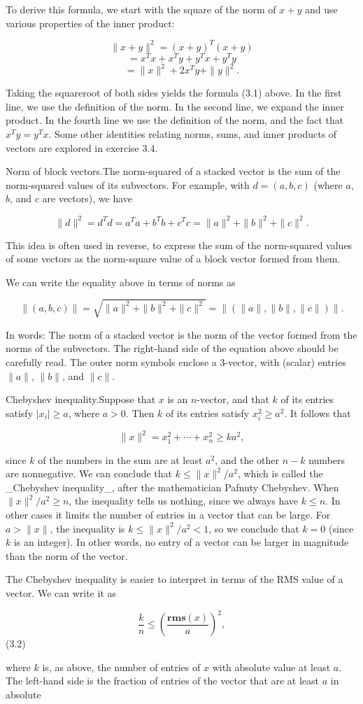 To derive this formula, we start with the square of the norm of \(x+y\) and use various properties of the inner product:

\[\|x+y\|^{2} = (x+y)^{T}(x+y)\] \[= x^{T}x+x^{T}y+y^{T}x+y^{T}y\] \[= \|x\|^{2}+2x^{T}y+\|y\|^{2}.\]

Taking the squareroot of both sides yields the formula (3.1) above. In the first line, we use the definition of the norm. In the second line, we expand the inner product. In the fourth line we use the definition of the norm, and the fact that \(x^{T}y=y^{T}x\). Some other identities relating norms, sums, and inner products of vectors are explored in exercise 3.4.

Norm of block vectors.The norm-squared of a stacked vector is the sum of the norm-squared values of its subvectors. For example, with \(d=(a,b,c)\) (where \(a\), \(b\), and \(c\) are vectors), we have

\[\|d\|^{2}=d^{T}d=a^{T}a+b^{T}b+c^{T}c=\|a\|^{2}+\|b\|^{2}+\|c\|^{2}.\]

This idea is often used in reverse, to express the sum of the norm-squared values of some vectors as the norm-square value of a block vector formed from them.

We can write the equality above in terms of norms as

\[\|(a,b,c)\|=\sqrt{\|a\|^{2}+\|b\|^{2}+\|c\|^{2}}=\|(\|a\|,\|b\|,\|c\|)\|.\]

In words: The norm of a stacked vector is the norm of the vector formed from the norms of the subvectors. The right-hand side of the equation above should be carefully read. The outer norm symbols enclose a 3-vector, with (scalar) entries \(\|a\|\), \(\|b\|\), and \(\|c\|\).

Chebyshev inequality.Suppose that \(x\) is an \(n\)-vector, and that \(k\) of its entries satisfy \(|x_{i}|\geq a\), where \(a>0\). Then \(k\) of its entries satisfy \(x_{i}^{2}\geq a^{2}\). It follows that

\[\|x\|^{2}=x_{1}^{2}+\cdots+x_{n}^{2}\geq ka^{2},\]

since \(k\) of the numbers in the sum are at least \(a^{2}\), and the other \(n-k\) numbers are nonnegative. We can conclude that \(k\leq\|x\|^{2}/a^{2}\), which is called the _Chebyshev inequality_, after the mathematician Pafnuty Chebyshev. When \(\|x\|^{2}/a^{2}\geq n\), the inequality tells us nothing, since we always have \(k\leq n\). In other cases it limits the number of entries in a vector that can be large. For \(a>\|x\|\), the inequality is \(k\leq\|x\|^{2}/a^{2}<1\), so we conclude that \(k=0\) (since \(k\) is an integer). In other words, no entry of a vector can be larger in magnitude than the norm of the vector.

The Chebyshev inequality is easier to interpret in terms of the RMS value of a vector. We can write it as

\[\frac{k}{n}\leq\left(\frac{\mathbf{rms}(x)}{a}\right)^{2},\] (3.2)

where \(k\) is, as above, the number of entries of \(x\) with absolute value at least \(a\). The left-hand side is the fraction of entries of the vector that are at least \(a\) in absolute 